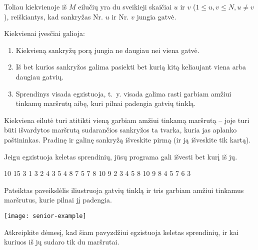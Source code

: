 \documentclass{boi2014-lt}
\begin{document}
    Toliau kiekvienoje iš $M$ eilučių yra du sveikieji skaičiai $u$ ir $v$
    ($1 \le u, v \le N, u \neq v$), reiškiantys, kad sankryžas Nr. $u$ ir Nr.
    $v$ jungia gatvė.

    Kiekvienai įvesčiai galioja:
    \begin{enumerate}
        \item Kiekvieną sankryžų porą jungia ne daugiau nei viena gatvė.
        \item Iš bet kurios sankryžos galima pasiekti bet kurią kitą keliaujant
            viena arba daugiau gatvių.
        \item Sprendinys visada egzistuoja, t.~y. visada galima rasti garbiam
            amžiui tinkamų maršrutų aibę, kuri pilnai padengia gatvių tinklą.
    \end{enumerate}

    \Output
    
    Kiekviena eilutė turi atitikti vieną garbiam amžiui tinkamą maršrutą --
    joje turi būti išvardytos maršrutą sudarančios sankryžos ta tvarka, kuria
    jas aplanko paštininkas. Pradinę ir galinę sankryžą išveskite pirmą (ir ją
    išveskite tik kartą).

    Jeigu egzistuoja keletas sprendinių, jūsų programa gali išvesti bet kurį
    iš jų.

    \Example

    \example
    {
        10 15  3  1 3  2 4  3 5  4 8  7  5 7  8  10  9
    }
    {
        2 3 4 5 8 10 9  8 4 5 7 6 3
    }
    {
        Pateiktas paveikslėlis iliustruoja gatvių tinklą ir tris garbiam amžiui
        tinkamus maršrutus, kurie pilnai jį padengia.

        \texttt{[image: senior-example]}

        Atkreipkite dėmesį, kad šiam pavyzdžiui egzistuoja keletas sprendinių,
        ir kai kuriuos iš jų sudaro tik du maršrutai.
    }
\end{document}

